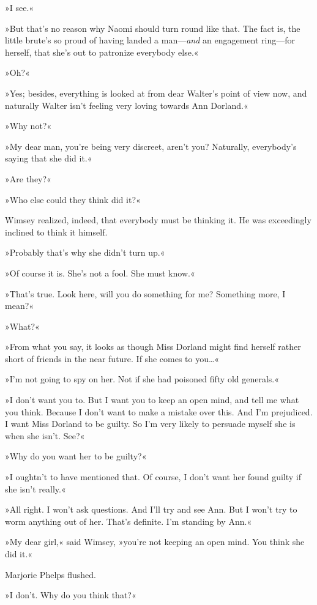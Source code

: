 »I see.«

»But that's no reason why Naomi should turn round like that. The fact is, the little brute's so proud of having landed a man—\textit{and} an engagement ring—for herself, that she's out to patronize everybody else.«

»Oh?«

»Yes; besides, everything is looked at from dear Walter's point of view now, and naturally Walter isn't feeling very loving towards Ann Dorland.«

»Why not?«

»My dear man, you're being very discreet, aren't you? Naturally, everybody's saying that she did it.«

»Are they?«

»Who else could they think did it?«

Wimsey realized, indeed, that everybody must be thinking it. He was exceedingly inclined to think it himself.

»Probably that's why she didn't turn up.«

»Of course it is. She's not a fool. She must know.«

»That's true. Look here, will you do something for me? Something more, I mean?«

»What?«

»From what you say, it looks as though Miss Dorland might find herself rather short of friends in the near future. If she comes to you\dots«

»I'm not going to spy on her. Not if she had poisoned fifty old generals.«

»I don't want you to. But I want you to keep an open mind, and tell me what you think. Because I don't want to make a mistake over this. And I'm prejudiced. I want Miss Dorland to be guilty. So I'm very likely to persuade myself she is when she isn't. See?«

»Why do you want her to be guilty?«

»I oughtn't to have mentioned that. Of course, I don't want her found guilty if she isn't really.«

»All right. I won't ask questions. And I'll try and see Ann. But I won't try to worm anything out of her. That's definite. I'm standing by Ann.«

»My dear girl,« said Wimsey, »you're not keeping an open mind. You think she did it.«

Marjorie Phelps flushed.

»I don't. Why do you think that?«

